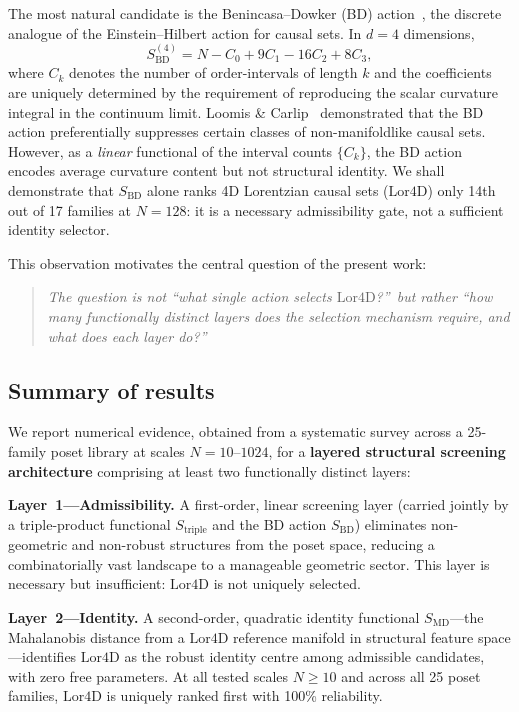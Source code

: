 \documentclass[12pt,a4paper]{article}
\newcommand{\SBD}{S_{\mathrm{BD}}}
\newcommand{\SMD}{S_{\mathrm{MD}}}
\newcommand{\Lor}{\mathrm{Lor4D}}
\begin{document}
The most natural candidate is the Benincasa--Dowker (BD) action~\cite{BenincasaDowker2010},
the discrete analogue of the Einstein--Hilbert action for causal sets.
In $d=4$ dimensions,
\begin{equation}\label{eq:SBD}
  \SBD^{(4)} = N - C_0 + 9C_1 - 16C_2 + 8C_3,
\end{equation}
where $C_k$ denotes the number of order-intervals of length $k$ and the
coefficients are uniquely determined by the requirement of reproducing the scalar
curvature integral in the continuum limit.
Loomis \& Carlip~\cite{LoomisCarlip2018} demonstrated that the BD action
preferentially suppresses certain classes of non-manifoldlike causal sets.
However, as a \emph{linear} functional of the interval counts $\{C_k\}$, the BD
action encodes average curvature content but not structural identity.
We shall demonstrate that $\SBD$ alone ranks 4D Lorentzian causal sets ($\Lor$)
only 14th out of 17 families at $N=128$: it is a necessary admissibility gate,
not a sufficient identity selector.

This observation motivates the central question of the present work:
\begin{quote}
\emph{The question is not ``what single action selects $\Lor$?''\ but rather
``how many functionally distinct layers does the selection mechanism require,
and what does each layer do?''}
\end{quote}

\subsection{Summary of results}

We report numerical evidence, obtained from a systematic survey across a
25-family poset library at scales $N=10$--$1024$, for a \textbf{layered
structural screening architecture} comprising at least two functionally distinct
layers:

\textbf{Layer~1---Admissibility.}
A first-order, linear screening layer (carried jointly by a triple-product
functional $S_{\mathrm{triple}}$ and the BD action $\SBD$) eliminates
non-geometric and non-robust structures from the poset space, reducing a
combinatorially vast landscape to a manageable geometric sector.
This layer is necessary but insufficient: $\Lor$ is not uniquely selected.

\textbf{Layer~2---Identity.}
A second-order, quadratic identity functional $\SMD$---the Mahalanobis distance
from a $\Lor$ reference manifold in structural feature space---identifies $\Lor$
as the robust identity centre among admissible candidates, with zero free
parameters.
At all tested scales $N\geq 10$ and across all 25 poset families, $\Lor$ is
uniquely ranked first with 100\% reliability.
\end{document}

